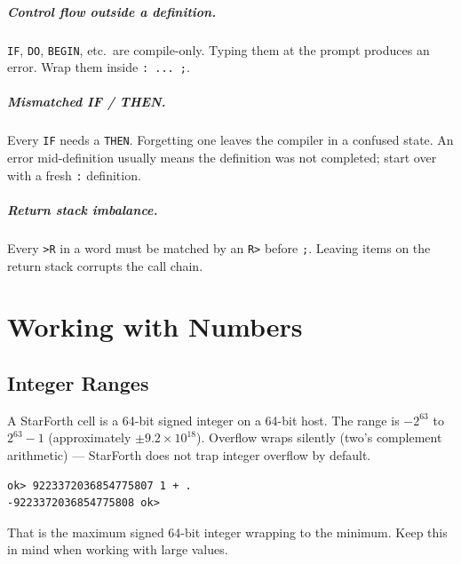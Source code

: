 \paragraph{Control flow outside a definition.}
\texttt{IF}, \texttt{DO}, \texttt{BEGIN}, etc.\ are compile-only. Typing them
at the prompt produces an error. Wrap them inside \texttt{: ... ;}.

\paragraph{Mismatched IF / THEN.}
Every \texttt{IF} needs a \texttt{THEN}. Forgetting one leaves the compiler in
a confused state. An error mid-definition usually means the definition was not
completed; start over with a fresh \texttt{:} definition.

\paragraph{Return stack imbalance.}
Every \texttt{>R} in a word must be matched by an \texttt{R>} before
\texttt{;}. Leaving items on the return stack corrupts the call chain.

\chapter{Working with Numbers}
\label{chap:numbers-detail}

\section{Integer Ranges}
\label{sec:int-ranges}

A StarForth cell is a 64-bit signed integer on a 64-bit host. The range is
$-2^{63}$ to $2^{63}-1$ (approximately $\pm9.2 \times 10^{18}$). Overflow
wraps silently (two's complement arithmetic) --- StarForth does not trap integer
overflow by default.

\begin{lstlisting}[language=Forth]
ok> 9223372036854775807 1 + .
-9223372036854775808 ok>
\end{lstlisting}

That is the maximum signed 64-bit integer wrapping to the minimum. Keep this
in mind when working with large values.

